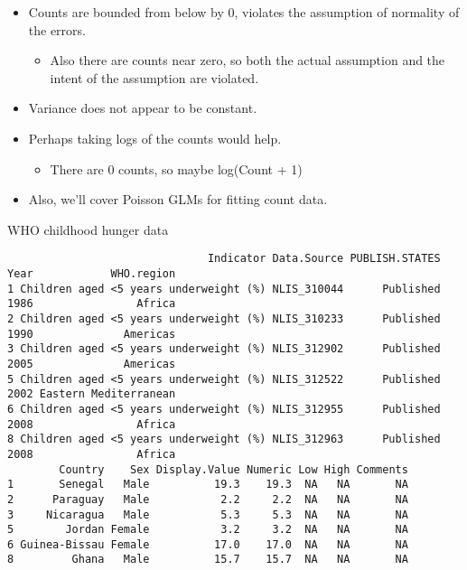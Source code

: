 \documentclass[12pt,openright,oneside,a4paper,chapter=TITLE,section=TITLE,subsection=Title,english,french,spanish,portugues,sumario=tradicional]{04-class-files/abntex2}
\newenvironment{Shaded}{\begin{snugshade}}{\end{snugshade}}
\newcommand{\CommentTok}[1]{\textcolor[rgb]{0.56,0.35,0.01}{\textit{#1}}}
\newcommand{\KeywordTok}[1]{\textcolor[rgb]{0.13,0.29,0.53}{\textbf{#1}}}
\newcommand{\NormalTok}[1]{#1}
\newcommand{\OperatorTok}[1]{\textcolor[rgb]{0.81,0.36,0.00}{\textbf{#1}}}
\newcommand{\StringTok}[1]{\textcolor[rgb]{0.31,0.60,0.02}{#1}}
\providecommand{\tightlist}{%
  \setlength{\itemsep}{0pt}\setlength{\parskip}{0pt}}
\begin{document}
\begin{itemize}
\tightlist
\item
  Counts are bounded from below by 0, violates the assumption of normality of the errors.

  \begin{itemize}
  \tightlist
  \item
    Also there are counts near zero, so both the actual assumption and the intent of the assumption are violated.
  \end{itemize}
\item
  Variance does not appear to be constant.
\item
  Perhaps taking logs of the counts would help.

  \begin{itemize}
  \tightlist
  \item
    There are 0 counts, so maybe log(Count + 1)
  \end{itemize}
\item
  Also, we'll cover Poisson GLMs for fitting count data.
\end{itemize}

WHO childhood hunger data

\begin{Shaded}
\end{Shaded}

\begin{verbatim}
                               Indicator Data.Source PUBLISH.STATES Year            WHO.region
1 Children aged <5 years underweight (%) NLIS_310044      Published 1986                Africa
2 Children aged <5 years underweight (%) NLIS_310233      Published 1990              Americas
3 Children aged <5 years underweight (%) NLIS_312902      Published 2005              Americas
5 Children aged <5 years underweight (%) NLIS_312522      Published 2002 Eastern Mediterranean
6 Children aged <5 years underweight (%) NLIS_312955      Published 2008                Africa
8 Children aged <5 years underweight (%) NLIS_312963      Published 2008                Africa
        Country    Sex Display.Value Numeric Low High Comments
1       Senegal   Male          19.3    19.3  NA   NA       NA
2      Paraguay   Male           2.2     2.2  NA   NA       NA
3     Nicaragua   Male           5.3     5.3  NA   NA       NA
5        Jordan Female           3.2     3.2  NA   NA       NA
6 Guinea-Bissau Female          17.0    17.0  NA   NA       NA
8         Ghana   Male          15.7    15.7  NA   NA       NA
\end{verbatim}
\end{document}
